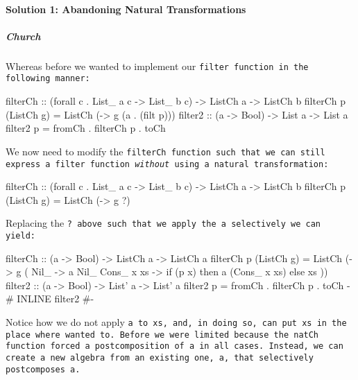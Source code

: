 \paragraph{Solution 1: Abandoning Natural Transformations}
\subparagraph{Church}
Whereas before we wanted to implement our \tt{filter} function in the following manner:
\begin{spec}
filterCh :: (forall c . List_ a c -> List_ b c) -> ListCh a -> ListCh b
filterCh p (ListCh g) = ListCh (\a -> g (a . (filt p)))
filter2 :: (a -> Bool) -> List a -> List a
filter2 p = fromCh . filterCh p . toCh
\end{spec}
We now need to modify the \tt{filterCh} function such that we can still express a filter function \textit{without} using a natural transformation:
\begin{spec}
filterCh :: (forall c . List_ a c -> List_ b c) -> ListCh a -> ListCh b
filterCh p (ListCh g) = ListCh (\a -> g ?)
\end{spec}
Replacing the \tt{?} above such that we apply the \tt{a} selectively we can yield:
\begin{code}
filterCh :: (a -> Bool) -> ListCh a -> ListCh a
filterCh p (ListCh g) = ListCh (\a -> g (\case
    Nil_ -> a Nil_
    Cons_ x xs -> if (p x) then a (Cons_ x xs) else xs
  ))
filter2 :: (a -> Bool) -> List' a -> List' a
filter2 p = fromCh . filterCh p . toCh
{-# INLINE filter2 #-}
\end{code}
Notice how we do not apply \tt{a} to \tt{xs}, and, in doing so, can put \tt{xs} in the place where wanted to.
Before we were limited because the \tt{natCh} function forced a postcomposition of \tt{a} in all cases.
Instead, we can create a new algebra from an existing one, \tt{a}, that selectively postcomposes \tt{a}.




